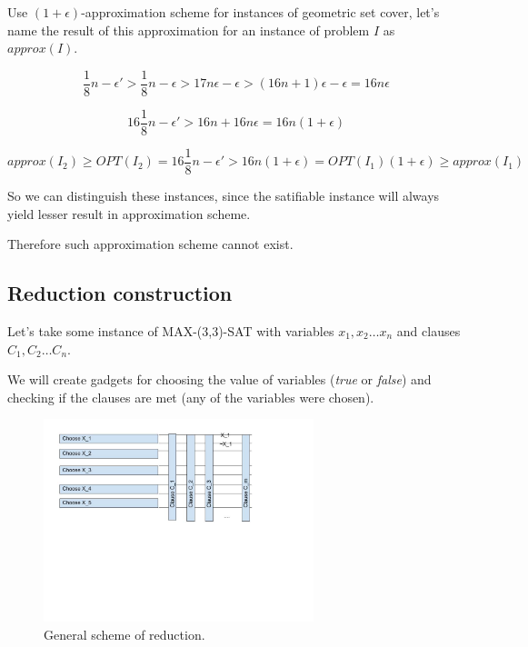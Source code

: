 Use $(1+\epsilon)$-approximation scheme for instances of geometric
set cover, let's name the result of this approximation
for an instance of problem $I$ as $approx(I)$.

$$\frac{1}{8}n - \epsilon' 
	> \frac{1}{8}n - \epsilon
	> 17n\epsilon - \epsilon
	> (16n+1)\epsilon - \epsilon = 16n\epsilon$$
	
$$16\frac{1}{8}n - \epsilon' > 16n + 16n\epsilon = 16n(1+\epsilon)$$

$$approx(I_2) \ge OPT(I_2) = 16\frac{1}{8}n - \epsilon'
	> 16n(1+\epsilon) = OPT(I_1)(1+\epsilon) \ge approx(I_1)$$ 

So we can distinguish these instances, since the satifiable instance
will always yield lesser result in approximation scheme.

Therefore such approximation scheme cannot exist.

\subsection{Reduction construction}
\label{reduction_construction}

Let's take some instance of  MAX-(3,3)-SAT with
variables $x_1, x_2 \ldots x_n$
and clauses $C_1, C_2 \dots C_n$.

We will create gadgets for choosing the value
of variables (\textit{true} or \textit{false}) and checking
if the clauses are met (any of the variables were chosen).

\begin{figure}[h]
\includegraphics[width=0.7\textwidth]{segment_apx_sketch.jpg}
\caption{General scheme of reduction.}
\label{fig:segment_apx}
\end{figure}

